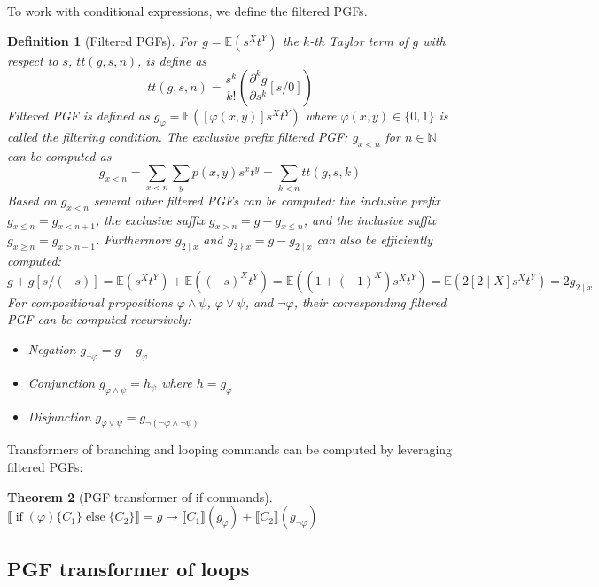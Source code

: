 \documentclass[a4paper]{article}
\renewcommand{\S}[1]{ \llbracket #1 \rrbracket }
\newcommand{\E}{ \mathbb{E} }
\newtheorem{theorem}{Theorem}[section]
\newtheorem{definition}[theorem]{Definition}
\begin{document}
To work with conditional expressions, we define the filtered PGFs.
\begin{definition}[Filtered PGFs]
	For \(g = \E(s^X t^Y)\) the \(k\)-th Taylor term of \(g\) with respect to \(s\), \(tt(g,s,n)\), is define as
	\[
		tt(g,s,n) = \frac{s^k}{k!}\left(\frac{\partial^k g}{\partial s^k}[s/0]\right)
	\]
	Filtered PGF is defined as \(g_{\varphi} = \E([\varphi(x,y)]s^X t^Y)\) where \(\varphi(x,y)\in \{0,1\}\) is called the filtering condition.
	The exclusive prefix filtered PGF: \(g_{x<n}\) for \(n\in\mathbb{N}\) can be computed as
	\[
		g_{x<n} = \sum_{x<n}\sum_y p(x,y) s^x t^y = \sum_{k<n} tt(g,s,k)
	\]
	Based on \(g_{x<n}\) several other filtered PGFs can be computed:
	the inclusive prefix \(g_{x\leq n} = g_{x<n+1}\),
	the exclusive suffix \(g_{x>n} = g - g_{x\leq n}\),
	and the inclusive suffix \(g_{x\geq n} = g_{x>n-1}\).
	Furthermore \(g_{2\mid x}\) and \(g_{2\nmid x}=g-g_{2\mid x}\) can also be efficiently computed:
	\[
		g + g[s/(-s)]
		= \E(s^X t^Y) + \E({(-s)}^X t^Y)
		= \E((1 + {(-1)}^X) s^X t^Y)
		= \E(2[2\mid X] s^X t^Y)
		= 2 g_{2\mid x}
	\]
	For compositional propositions \(\varphi \land \psi\), \(\varphi\lor \psi\), and \(\lnot \varphi\), their corresponding filtered PGF can be computed recursively:
	\begin{itemize}
		\item Negation \(g_{\lnot \varphi} = g-g_{\varphi}\)
		\item Conjunction \(g_{\varphi \land \psi} = h_{\psi}\) where \(h = g_{\varphi}\)
		\item Disjunction \(g_{\varphi \lor \psi} = g_{\lnot (\lnot \varphi \land \lnot \psi)}\)
	\end{itemize}
\end{definition}
Transformers of branching and looping commands can be computed by leveraging filtered PGFs:
\begin{theorem}[PGF transformer of if commands]
	\(
	\S{\operatorname{if}(\varphi)\{C_1\}\operatorname{else}\{C_2\}} =
	g\mapsto \S{C_1}(g_{\varphi}) + \S{C_2}(g_{\lnot \varphi})
	\)
\end{theorem}

\subsection{PGF transformer of loops}
\end{document}
